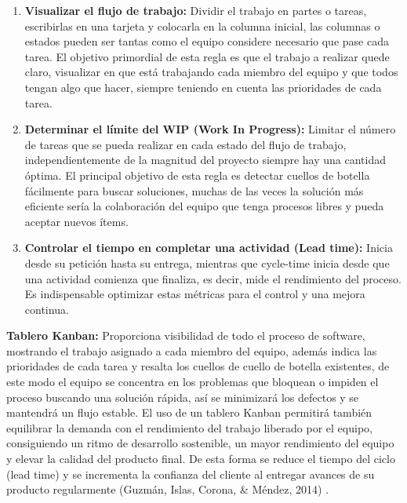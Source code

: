 \documentclass[../Main.tex]{subfiles}
\begin{document}
\begin{enumerate}
	\item \textbf{Visualizar el flujo de trabajo:} Dividir el trabajo en partes o tareas, escribirlas en una tarjeta y colocarla en la columna inicial, las columnas o estados pueden ser tantas como el equipo considere necesario que pase cada tarea. El objetivo primordial de esta regla es que el trabajo a realizar quede claro, visualizar en que está trabajando cada miembro del equipo y que todos tengan algo que hacer, siempre teniendo en cuenta las prioridades de cada tarea. \par

	\item \textbf{Determinar el límite del WIP (Work In Progress):} Limitar el número de tareas que se pueda realizar en cada estado del flujo de trabajo, independientemente de la magnitud del proyecto siempre hay una cantidad óptima. El principal objetivo de esta regla es detectar cuellos de botella fácilmente para buscar soluciones, muchas de las veces la solución más eficiente sería la colaboración del equipo que tenga procesos libres y pueda aceptar nuevos ítems.   \par

	\item \textbf{Controlar el tiempo en completar una actividad (Lead time):} Inicia desde su petición hasta su entrega, mientras que cycle-time inicia desde que una actividad comienza que finaliza, es decir, mide el rendimiento del proceso. Es indispensable optimizar estas métricas para el control y una mejora continua. 
\end{enumerate}\par

\begin{justify}
\textbf{Tablero Kanban:} Proporciona visibilidad de todo el proceso de software, mostrando el trabajo asignado a cada miembro del equipo, además indica las prioridades de cada tarea y resalta los cuellos de cuello de botella existentes, de este modo el equipo se concentra en los problemas que bloquean o impiden el proceso buscando una solución rápida, así se minimizará los defectos y se mantendrá un flujo estable. El uso de un tablero Kanban permitirá también equilibrar la demanda con el rendimiento del trabajo liberado por el equipo, consiguiendo un ritmo de desarrollo sostenible, un mayor rendimiento del equipo y elevar la calidad del producto final. De esta forma se reduce el tiempo del ciclo (lead time) y se incrementa la confianza del cliente al entregar avances de su producto regularmente (Guzmán, Islas, Corona, \& Méndez, 2014) \cite{30}. 
\end{justify}\par
\end{document}
